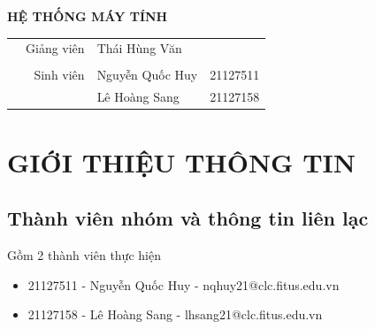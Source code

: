 \documentclass[12pt, a4paper]{article}
\begin{document}
\begin{titlepage}
    \bigskip
    \bigskip

    \centerline{\LARGE{\textbf{HỆ THỐNG MÁY TÍNH}}}
    \raggedright
    \bigskip

    \begin{table}[h]
        \begin{adjustbox}{width=\columnwidth,center}
            \begin{tabular}{rrlc}
                 & Giảng viên      & Thái Hùng Văn       &          \\
                 &                 &                     &          \\
                 & Sinh viên       & Nguyễn Quốc Huy     & 21127511 \\
                 &                 & Lê Hoàng Sang       & 21127158 \\
            \end{tabular}
        \end{adjustbox}
    \end{table}
\end{titlepage}




\pagestyle{fancy}
\fancyhf{}
\addtolength{\topmargin}{-0.70894pt}
\setlength{\headheight}{12.70894pt}

\rfoot{\textbf{\thepage}}




\tableofcontents

\pagebreak

\section{GIỚI THIỆU THÔNG TIN}

\subsection{Thành viên nhóm và thông tin liên lạc}
Gồm 2 thành viên thực hiện
\begin{itemize}
    \item 21127511 - Nguyễn Quốc Huy - nqhuy21@clc.fitus.edu.vn
    \item 21127158 - Lê Hoàng Sang - lhsang21@clc.fitus.edu.vn
\end{itemize}
\end{document}
